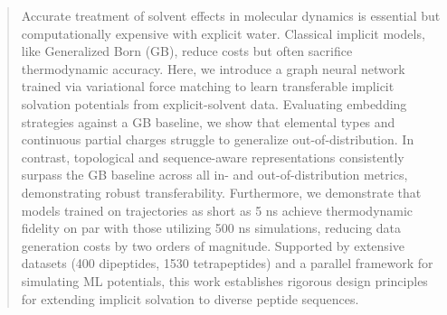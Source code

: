 \begin{abstract}
Accurate treatment of solvent effects in molecular dynamics is essential but computationally expensive with explicit water. Classical implicit models, like Generalized Born (GB), reduce costs but often sacrifice thermodynamic accuracy. Here, we introduce a graph neural network trained via variational force matching to learn transferable implicit solvation potentials from explicit-solvent data. Evaluating embedding strategies against a GB baseline, we show that elemental types and continuous partial charges struggle to generalize out-of-distribution. In contrast, topological and sequence-aware representations consistently surpass the GB baseline across all in- and out-of-distribution metrics, demonstrating robust transferability. Furthermore, we demonstrate that models trained on trajectories as short as 5 ns achieve thermodynamic fidelity on par with those utilizing 500 ns simulations, reducing data generation costs by two orders of magnitude. Supported by extensive datasets (400 dipeptides, 1530 tetrapeptides) and a parallel framework for simulating ML potentials, this work establishes rigorous design principles for extending implicit solvation to diverse peptide sequences.

\end{abstract}


